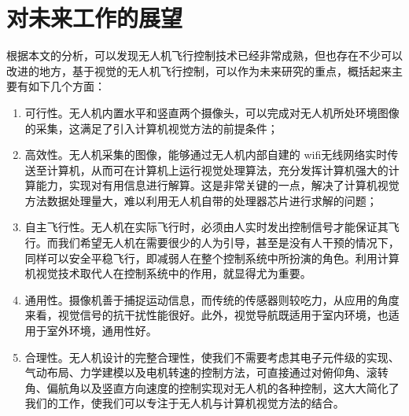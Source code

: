 \section{对未来工作的展望}
根据本文的分析，可以发现无人机飞行控制技术已经非常成熟，但也存在不少可以改进的地方，基于视觉的无人机飞行控制，可以作为未来研究的重点，概括起来主要有如下几个方面：
\vspace{-10pt}
\begin{enumerate}
\item 可行性。无人机内置水平和竖直两个摄像头，可以完成对无人机所处环境图像的采集，这满足了引入计算机视觉方法的前提条件；
\item 高效性。无人机采集的图像，能够通过无人机内部自建的 wifi无线网络实时传送至计算机，从而可在计算机上运行视觉处理算法，充分发挥计算机强大的计算能力，实现对有用信息进行解算。这是非常关键的一点，解决了计算机视觉方法数据处理量大，难以利用无人机自带的处理器芯片进行求解的问题；
\item 自主飞行性。无人机在实际飞行时，必须由人实时发出控制信号才能保证其飞行。而我们希望无人机在需要很少的人为引导，甚至是没有人干预的情况下，同样可以安全平稳飞行，即减弱人在整个控制系统中所扮演的角色。利用计算机视觉技术取代人在控制系统中的作用，就显得尤为重要。
\item 通用性。摄像机善于捕捉运动信息，而传统的传感器则较吃力，从应用的角度来看，视觉信号的抗干扰性能很好。此外，视觉导航既适用于室内环境，也适用于室外环境，通用性好。
\item 合理性。无人机设计的完整合理性，使我们不需要考虑其电子元件级的实现、气动布局、力学建模以及电机转速的控制方法，可直接通过对俯仰角、滚转角、偏航角以及竖直方向速度的控制实现对无人机的各种控制，这大大简化了我们的工作，使我们可以专注于无人机与计算机视觉方法的结合。

\end{enumerate}
